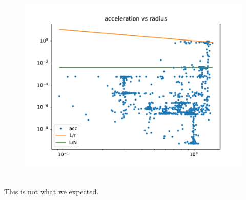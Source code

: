         \newpage
        \begin{figure}[h!]
            \centering
            \includegraphics[width=\textwidth]{../figures/acc2.pdf}
        \end{figure} \ \\ 
        This is not what we expected. 
